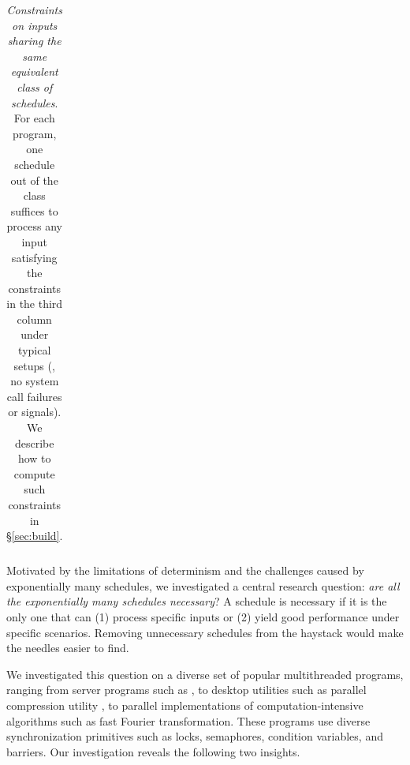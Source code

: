 \begin{table}[t]
\begin{tabular}{lll}






\end{tabular}
\vspace{-.05in}
\caption{{\em Constraints on inputs sharing the same equivalent class of
    schedules}.  For each program, one schedule out of the class
  suffices to process any input satisfying the constraints in the
  third column under typical setups (\eg, no system call failures or signals).  We describe how to compute such constraints in \S\ref{sec:build}.} \label{tab:sched-constraints}
\vspace{-.15in}
\end{table}

Motivated by the limitations of determinism and the
challenges caused by exponentially many schedules, we investigated a
central research question: \emph{are all the exponentially many schedules
  necessary}?  A schedule is necessary if it is the only one
that can (1) process specific inputs or (2) yield good performance under
specific scenarios. Removing unnecessary schedules from the haystack would
make the needles easier to find.

We investigated this question on a
diverse set of popular multithreaded programs, ranging from server
programs such as \apache, to desktop utilities such as parallel compression utility
\pbzip, to parallel implementations of computation-intensive algorithms
such as fast Fourier transformation.  These programs use diverse
synchronization primitives such as locks, semaphores, condition variables,
and barriers.  Our investigation reveals the following two insights.

